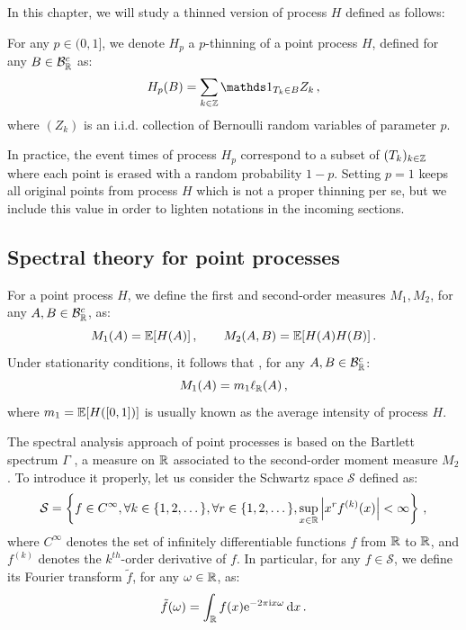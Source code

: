 In this chapter, we will study a thinned version of process $H$ defined as follows:
\begin{definition}\label{def:chap5_thinning}
For any $p\in(0,1]$, we denote $H_p$ a $p$-thinning of a point process $H$, defined for any $B\in\mathcal{B}_{{\mathbb R}}^c$ as:
\[H_p(B) = \sum_{k\in\ZZ}{\II_{T_k \in B} Z_k}\,,\]
where $(Z_k)$ is an i.i.d. collection of Bernoulli random variables of parameter $p$.
\end{definition}

In practice, the event times of process $H_p$ correspond to a subset of $(T_k)_{k\in{\mathbb Z}}$ where each point
is erased with a random probability $1-p$. 
Setting $p = 1$ keeps all original points from process $H$ which is not a proper thinning per se,
but we include this value in order to lighten notations in the incoming sections. 

\subsection{Spectral theory for point processes}\label{sec:chap5_spectral_theory}

For a point process $H$, we define the first and second-order measures $M_1, M_2$, for any $A, B\in\mathcal{B}_{{\mathbb R}}^c$, as:
\[M_1(A) = {\mathbb E}[H(A)]\,,\qquad M_2(A,B) = {\mathbb E}[H(A)H(B)]\,.\]
Under stationarity conditions, it follows that \parencite[Proposition 8.1.I]{DaleyV1}, for any $A, B\in\mathcal{B}_{{\mathbb R}}^c$:
\[M_1(A) = m_1 \ell_{{\mathbb R}}(A)\,,\]
where $m_1 = {\mathbb E}[H([0,1])]$ is usually known as the average intensity of process $H$.

The spectral analysis approach of point processes is based on the Bartlett spectrum $\Gamma$ \parencite{Bartlett1963}, 
a measure on ${\mathbb R}$ associated to the second-order moment measure $M_2$. 
To introduce it properly, let us consider the Schwartz space $\mathcal{S}$ defined as:
\[
    \mathcal S = \left\{ f \in C^\infty, \forall k \in \{1, 2, \dots\}, \forall r \in \{1, 2, \dots\},
    \sup_{x \in {\mathbb R}} \left| x^r
    f^{(k)}(x)
    \right| < \infty \right\}\,,
\] where $C^\infty$ denotes the set of infinitely differentiable functions $f$ from ${\mathbb R}$ to ${\mathbb R}$, 
and $f^{(k)}$ denotes the $k^{th}$-order derivative of $f$.
In particular, for any $f\in\mathcal{S}$, we define its Fourier transform $\tilde f$, for any $\omega\in{\mathbb R}$, as:
\[\tilde f (\omega) = \int_{{\mathbb R}}{f(x) \mathrm{e}^{-2\pi\mathrm{i} x \omega}\,{\mathrm{d}} x}\,.\]

